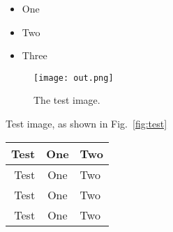 \begin{itemize}
\item One
\item Two
\item Three
\end{itemize}

\begin{figure}
\centering
\texttt{[image: out.png]}
\caption{\label{fig:test} The test image.}
\end{figure}

Test image, as shown in Fig.~\vref{fig:test}

\begin{table}[t]
\centering
\begin{tabular}{r|c l}
Test & One & Two \\
\hline
Test & One & Two \\Test & One & Two \\Test & One & Two \\
\end{tabular}
\end{table}

